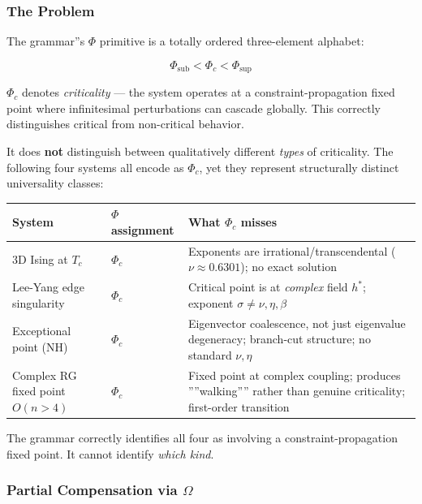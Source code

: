 \documentclass[12pt,a4paper]{article}
\begin{document}
\subsubsection{The Problem}

The grammar''s $\Phi$ primitive is a totally ordered three-element alphabet:


\[\Phi_\text{sub} < \Phi_c < \Phi_\text{sup}\]

$\Phi_c$ denotes \emph{criticality} --- the system operates at a constraint-propagation fixed point where infinitesimal perturbations can cascade globally. This correctly distinguishes critical from non-critical behavior.

It does \textbf{not} distinguish between qualitatively different \emph{types} of criticality. The following four systems all encode as $\Phi_c$, yet they represent structurally distinct universality classes:

\begin{table}[htbp]
\centering
\small
{}
\begin{tabularx}{\textwidth}{>{\centering\arraybackslash}X >{\centering\arraybackslash}X >{\centering\arraybackslash}X}
\toprule
\rowcolor{gray!25}\textbf{System} & \textbf{$\Phi$ assignment} & \textbf{What $\Phi_c$ misses} \\
\midrule
\rowcolors{1}{white}{gray!10}
3D Ising at $T_c$ & $\Phi_c$ & Exponents are irrational/transcendental ($\nu \approx 0.6301$); no exact solution \\
Lee-Yang edge singularity & $\Phi_c$ & Critical point is at \emph{complex} field $h^*$; exponent $\sigma \neq \nu, \eta, \beta$ \\
Exceptional point (NH) & $\Phi_c$ & Eigenvector coalescence, not just eigenvalue degeneracy; branch-cut structure; no standard $\nu, \eta$ \\
Complex RG fixed point $O(n > 4)$ & $\Phi_c$ & Fixed point at complex coupling; produces ''''walking'''' rather than genuine criticality; first-order transition \\
\bottomrule
\end{tabularx}
\end{table}

The grammar correctly identifies all four as involving a constraint-propagation fixed point. It cannot identify \emph{which kind}.

\subsubsection{Partial Compensation via $\Omega$}
\end{document}
